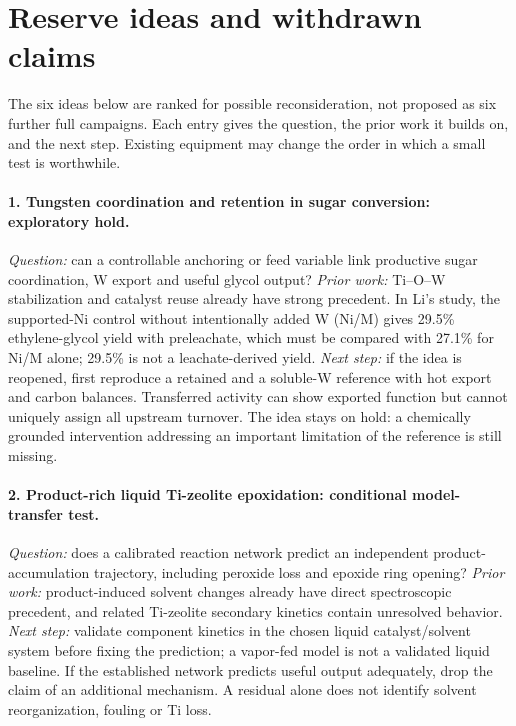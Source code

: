 \section{Reserve ideas and withdrawn claims}
\label{sec:shortlist}

The six ideas below are ranked for possible reconsideration, not proposed as six further full campaigns. Each entry gives the question, the prior work it builds on, and the next step. Existing equipment may change the order in which a small test is worthwhile.

\paragraph{1. Tungsten coordination and retention in sugar conversion: exploratory hold.}
\emph{Question:} can a controllable anchoring or feed variable link productive sugar coordination, W export and useful glycol output? \emph{Prior work:} Ti--O--W stabilization and catalyst reuse already have strong precedent. In Li's study, the supported-Ni control without intentionally added W (Ni/M) gives 29.5\% ethylene-glycol yield with preleachate, which must be compared with 27.1\% for Ni/M alone; 29.5\% is not a leachate-derived yield.\citep{li2020w,li2020wsi} \emph{Next step:} if the idea is reopened, first reproduce a retained and a soluble-W reference with hot export and carbon balances. Transferred activity can show exported function but cannot uniquely assign all upstream turnover. The idea stays on hold: a chemically grounded intervention addressing an important limitation of the reference is still missing.

\paragraph{2. Product-rich liquid Ti-zeolite epoxidation: conditional model-transfer test.}
\emph{Question:} does a calibrated reaction network predict an independent product-accumulation trajectory, including peroxide loss and epoxide ring opening? \emph{Prior work:} product-induced solvent changes already have direct spectroscopic precedent, and related Ti-zeolite secondary kinetics contain unresolved behavior.\citep{torres2023thesis,kwon2024} \emph{Next step:} validate component kinetics in the chosen liquid catalyst/solvent system before fixing the prediction; a vapor-fed model is not a validated liquid baseline. If the established network predicts useful output adequately, drop the claim of an additional mechanism. A residual alone does not identify solvent reorganization, fouling or Ti loss.

